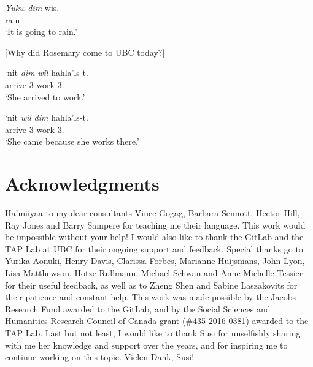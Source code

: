 \documentclass[output=paper]{langscibook}
\begin{document}
\begin{exe}
\ex \label{Todoro50}
\gll \textit{{Yukw}} 	\textit{{dim}} 	{wis}.  \\
   rain \\
\glt `It is going to rain.' 

\ex \label{Todoro51} [{Why did Rosemary come to UBC today?}] 
\begin{xlist}

\ex \label{Todoro51a}
	{‘nit}	  \textit{{dim}}	\textit{{wil}}	{hahla’ls-t}. \\
    arrive	3   		work-3.{\seriesII}\\
\glt `She arrived to work.' 

\ex \label{Todoro51b}
	{‘nit}	     \textit{{wil}}	\textit{{dim}} 	{hahla’ls-t}. \\
    arrive	3     		work-3.{\seriesII}\\
\glt `She came because she works there.' 

\end{xlist}
\end{exe}


\section*{Acknowledgments}
Ha’miiyaa to my dear consultants Vince Gogag, Barbara Sennott, Hector Hill, Ray Jones and Barry Sampere for teaching me their language. This work would be impossible without your help! I would also like to thank the GitLab and the TAP Lab at UBC for their ongoing support and feedback. Special thanks go to Yurika Aonuki, Henry Davis, Clarissa Forbes, Marianne Huijsmans, John Lyon, Lisa Matthewson, Hotze Rullmann, Michael Schwan and Anne-Michelle Tessier for their useful feedback, as well as to Zheng Shen and Sabine Laszakovits for their patience and constant help. This work was made possible by the Jacobs Research Fund awarded to the GitLab, and by the Social Sciences and Humanities Research Council of Canada grant (\#435-2016-0381) awarded to the TAP Lab. Last but not least, I would like to thank Susi for unselfishly sharing with me her knowledge and support over the years, and for inspiring me to continue working on this topic. Vielen Dank, Susi!
\end{document}
